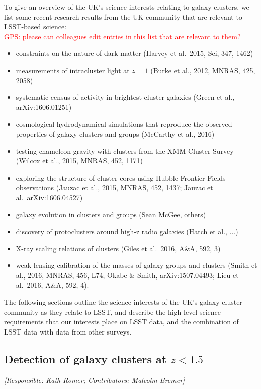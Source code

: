 \documentclass[a4paper,11pt]{article}
\newcommand{\red}{\textcolor{red}}
\begin{document}
To give an overview of the UK's science interests relating to galaxy
clusters, we list some recent research results from the UK community
that are relevant to LSST-based science: \\\red{GPS: please can
  colleagues edit entries in this list that are relevant to them?}
\begin{itemize}
\item constraints on the nature of dark matter (Harvey et al.\ 2015,
  Sci, 347, 1462)
\item measurements of intracluster light at $z=1$ (Burke et al., 2012,
  MNRAS, 425, 2058)
\item systematic census of activity in brightest cluster galaxies
  (Green et al., arXiv:1606.01251)
\item cosmological hydrodynamical simulations that reproduce the
  observed properties of galaxy clusters and groups (McCarthy et al.,
  2016)
\item testing chameleon gravity with clusters from the XMM Cluster
  Survey (Wilcox et al., 2015, MNRAS, 452, 1171)
\item exploring the structure of cluster cores using Hubble Frontier
  Fields observations (Jauzac et al., 2015, MNRAS, 452, 1437; Jauzac
  et al.\ arXiv:1606.04527)
\item galaxy evolution in clusters and groups (Sean McGee, others)
\item discovery of protoclusters around high-z radio galaxies (Hatch
  et al., ...)
\item X-ray scaling relations of clusters (Giles et al.\ 2016, A\&A,
  592, 3)
\item weak-lensing calibration of the masses of galaxy groups and
  clusters (Smith et al., 2016, MNRAS, 456, L74; Okabe \& Smith,
  arXiv:1507.04493; Lieu et al.\ 2016, A\&A, 592, 4).
\end{itemize}
The following sections outline the science interests of the UK's
galaxy cluster community as they relate to LSST, and describe the high
level science requirements that our interests place on LSST data, and
the combination of LSST data with data from other surveys.

\subsection{Detection of galaxy clusters at $z<1.5$}\label{sec:clusdet}

{\it [Responsible: Kath Romer; Contributors: Malcolm Bremer]}
\end{document}
